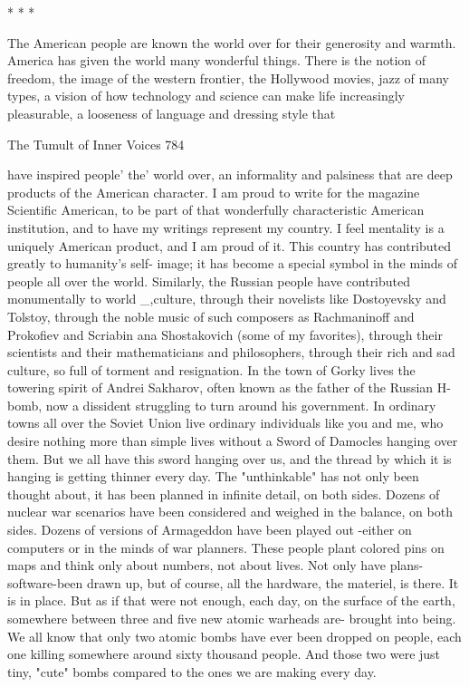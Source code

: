                                         *   *   *

        The American people are known the world over for their generosity and
warmth. America has given the world many wonderful things. There is the notion of
freedom, the image of the western frontier, the Hollywood movies, jazz of many
types, a vision of how technology and science can make life increasingly pleasurable,
a looseness of language and dressing style that




The Tumult of Inner Voices                                                             784

have inspired people' the' world over, an informality and palsiness that are deep
products of the American character. I am proud to write for the magazine Scientific
American, to be part of that wonderfully characteristic American institution, and to
have my writings represent my country. I feel mentality is a uniquely American
product, and I am proud of it. This country has contributed greatly to humanity's self-
image; it has become a special symbol in the minds of people all over the world.
Similarly, the Russian people have contributed monumentally to world \_,culture,
through their novelists like Dostoyevsky and Tolstoy, through the noble music of such
composers as Rachmaninoff and Prokofiev and Scriabin ana Shostakovich (some of
my favorites), through their scientists and their mathematicians and philosophers,
through their rich and sad culture, so full of torment and resignation. In the town of
Gorky lives the towering spirit of Andrei Sakharov, often known as the father of the
Russian H-bomb, now a dissident struggling to turn around his government. In
ordinary towns all over the Soviet Union live ordinary individuals like you and me,
who desire nothing more than simple lives without a Sword of Damocles hanging
over them.
       But we all have this sword hanging over us, and the thread by which it is
hanging is getting thinner every day. The "unthinkable" has not only been thought
about, it has been planned in infinite detail, on both sides. Dozens of nuclear war
scenarios have been considered and weighed in the balance, on both sides. Dozens of
versions of Armageddon have been played out -either on computers or in the minds of
war planners. These people plant colored pins on maps and think only about numbers,
not about lives.
       Not only have plans-software-been drawn up, but of course, all the hardware,
the materiel, is there. It is in place. But as if that were not enough, each day, on the
surface of the earth, somewhere between three and five new atomic warheads are-
brought into being. We all know that only two atomic bombs have ever been dropped
on people, each one killing somewhere around sixty thousand people. And those two
were just tiny, "cute" bombs compared to the ones we are making every day.

